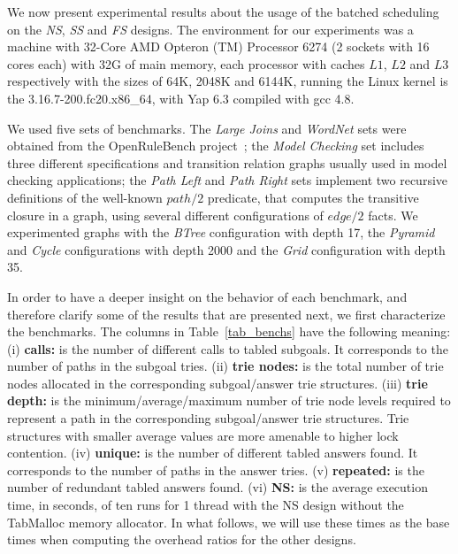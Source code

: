 \documentclass{llncs}
\begin{document}
We now present experimental results about the usage of the batched
scheduling on the \emph{NS}, \emph{SS} and \emph{FS} designs. The
environment for our experiments was a machine with 32-Core AMD Opteron
(TM) Processor 6274 (2 sockets with 16 cores each) with 32G of main
memory, each processor with caches $L1$, $L2$ and $L3$ respectively
with the sizes of 64K, 2048K and 6144K, running the Linux kernel is
the 3.16.7-200.fc20.x86\_64, with Yap 6.3 compiled with gcc 4.8.

We used five sets of benchmarks. The \emph{Large Joins} and
\emph{WordNet} sets were obtained from the OpenRuleBench
project~\cite{Liang-09}; the \emph{Model Checking} set includes three
different specifications and transition relation graphs usually used
in model checking applications; the \emph{Path Left} and \emph{Path
  Right} sets implement two recursive definitions of the well-known
$path/2$ predicate, that computes the transitive closure in a graph,
using several different configurations of $edge/2$ facts. We
experimented graphs with the \emph{BTree} configuration with depth 17,
the \emph{Pyramid} and \emph{Cycle} configurations with depth 2000 and
the \emph{Grid} configuration with depth 35. 

In order to have a deeper insight on the behavior of each benchmark,
and therefore clarify some of the results that are presented next, we
first characterize the benchmarks. The columns in
Table~\ref{tab_benchs} have the following meaning: (i) {\bf calls:} is
the number of different calls to tabled subgoals. It corresponds to
the number of paths in the subgoal tries. (ii) {\bf trie nodes:} is
the total number of trie nodes allocated in the corresponding
subgoal/answer trie structures. (iii) {\bf trie depth:} is the
minimum/average/maximum number of trie node levels required to
represent a path in the corresponding subgoal/answer trie
structures. Trie structures with smaller average values are more
amenable to higher lock contention. (iv) {\bf unique:} is the number
of different tabled answers found. It corresponds to the number of
paths in the answer tries. (v) {\bf repeated:} is the number of
redundant tabled answers found. (vi) {\bf NS:} is the average
execution time, in seconds, of ten runs for 1 thread with the NS
design without the TabMalloc memory allocator. In what follows, we
will use these times as the base times when computing the overhead
ratios for the other designs.
\end{document}
